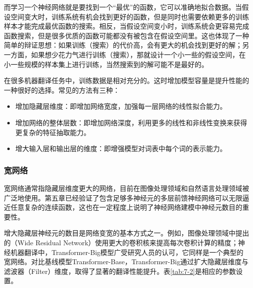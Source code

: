 \parinterval 而学习一个神经网络就是要找到一个``最优''的函数，它可以准确地拟合数据。当假设空间变大时，训练系统有机会找到更好的函数，但是同时也需要依赖更多的训练样本才能完成最优函数的搜索。相反，当假设空间变小时，训练系统会更容易完成函数搜索，但是很多优质的函数可能都没有被包含在假设空间里。这也体现了一种简单的辩证思想：如果训练（搜索）的代价高，会有更大的机会找到更好的解；另一方面，如果想少花力气进行训练（搜索），那就设计一个小一些的假设空间，在小一些规模的样本集上进行训练，当然搜索到的解可能不是最好的。

\parinterval 在很多机器翻译任务中，训练数据是相对充分的。这时增加模型容量是提升性能的一种很好的选择。常见的方法有三种：

\begin{itemize}
\vspace{0.5em}
\item 增加隐藏层维度：即增加网络宽度，加强每一层网络的线性拟合能力。
\vspace{0.5em}
\item 增加网络的整体层数：即增加网络深度，利用更多的线性和非线性变换来获得更复杂的特征抽取能力。
\vspace{0.5em}
\item 增大输入层和输出层的维度：即增强模型对词表中每个词的表示能力。
\vspace{0.5em}
\end{itemize}


\subsubsection{宽网络}

\parinterval 宽网络通常指隐藏层维度更大的网络，目前在图像处理领域和自然语言处理领域被广泛地使用。第五章已经验证了包含足够多神经元的多层前馈神经网络可以无限逼近任意复杂的连续函数\cite{Hornic1989Multilayer}，这也在一定程度上说明了神经网络建模中神经元数目的重要性。

\parinterval 增大隐藏层神经元的数目是网络变宽的基本方式之一。例如，图像处理领域中提出的{\small{}}（Wide Residual Network）使用更大的卷积核来提高每次卷积计算的精度\cite{DBLP:conf/bmvc/ZagoruykoK16}；神经机器翻译中，Transformer-Big模型广受研究人员的认可\cite{NIPS2017_7181}，它同样是一个典型的宽网络。对比基线模型Transformer-Base，Transformer-Big通过扩大隐藏层维度与滤波器（Filter）维度，取得了显著的翻译性能提升。表\ref{tab:7-2}是相应的参数设置。

